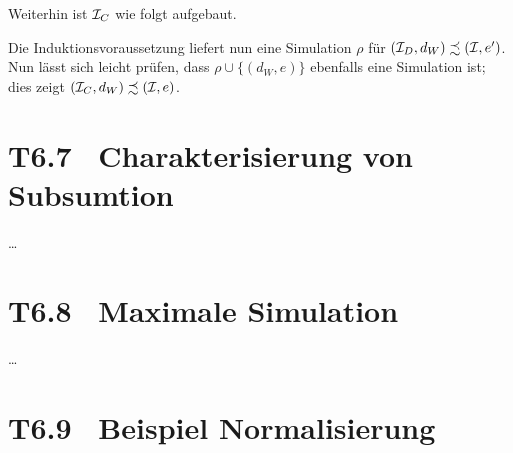 \documentclass[fontsize=11pt, twoside=false, numbers=autoenddot]{scrbook}
\begin{document}
\begin{description}
\begin{description}
\begin{description}
            Weiterhin ist $\mathcal{I}_C$ wie folgt aufgebaut.
            \begin{center}
            \end{center}
            \parI
            Die Induktionsvoraussetzung liefert nun eine Simulation
            $\rho$ für $(\mathcal{I}_D,d_W) \precsim (\mathcal{I},e')$.
            Nun lässt sich leicht prüfen, dass $\rho \cup \{(d_W,e)\}$
            ebenfalls eine Simulation ist;
            dies zeigt $(\mathcal{I}_C,d_W) \precsim (\mathcal{I},e)$.
            \qedhere
        \end{description}
    \end{description}
\end{description}

\section*{T6.7~ Charakterisierung von Subsumtion}

\dots

\section*{T6.8~ Maximale Simulation}

\dots

\section*{T6.9~ Beispiel Normalisierung}
\end{document}
